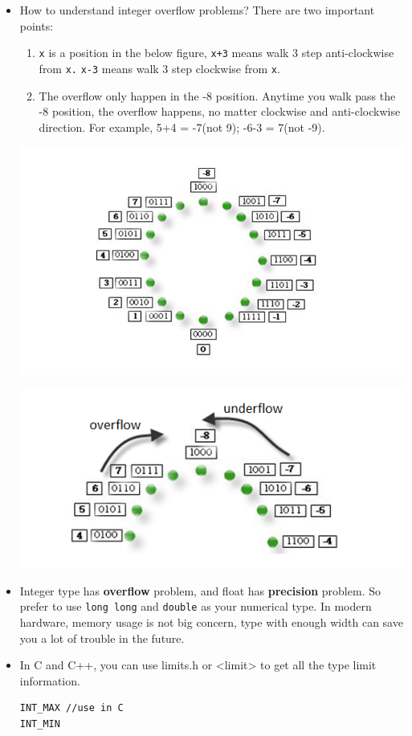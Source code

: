 \documentclass[a4paper,11pt,twoside]{book}
\begin{document}
\begin{itemize}
	\item How to understand integer overflow problems? There are two important points:
	\begin{enumerate}
		\item \texttt{x} is a position in the below figure, \texttt{x+3} means walk 3 step anti-clockwise from \texttt{x.} \texttt{x-3} means walk 3 step clockwise from \texttt{x}.
		
		\item The overflow only happen in the -8 position. Anytime you walk pass the -8 position, the overflow happens, no matter clockwise and anti-clockwise direction. For example, 5+4 = -7(not 9); -6-3 = 7(not -9).
	\end{enumerate}
	
	\begin{center}
		\includegraphics[width=0.6\linewidth]{pics/integer.png}
		
		\includegraphics[width=0.6\linewidth]{pics/integer1.png}
	\end{center}
	
	\item Integer type has \textbf{overflow} problem, and float has \textbf{precision} problem. So prefer to use \texttt{long long} and \texttt{double} as your numerical type. In modern hardware, memory usage is not big concern, type with enough width can save you a lot of trouble in the future. 
	
	\item In C and C++, you can use limits.h or <limit> to get all the type limit information.
	
\begin{lstlisting}[numbers=none]
INT_MAX //use in C
INT_MIN


\end{lstlisting}
\end{itemize}
\end{document}
